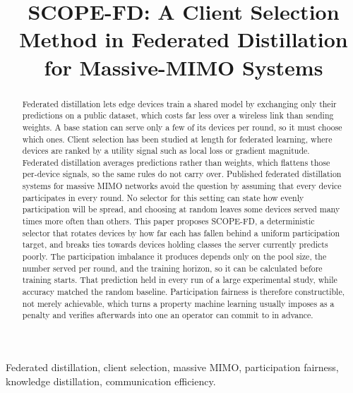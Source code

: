\documentclass[journal]{IEEEtran}
\newcommand{\rev}[1]{#1}
\begin{document}
\title{SCOPE-FD: A Client Selection Method in Federated Distillation for Massive-MIMO Systems}

\author{
}

\maketitle

\begin{abstract}
\rev{Federated distillation lets edge devices train a shared model by exchanging only their predictions on a public dataset, which costs far less over a wireless link than sending weights. A base station can serve only a few of its devices per round, so it must choose which ones. Client selection has been studied at length for federated learning, where devices are ranked by a utility signal such as local loss or gradient magnitude. Federated distillation averages predictions rather than weights, which flattens those per-device signals, so the same rules do not carry over. Published federated distillation systems for massive MIMO networks avoid the question by assuming that every device participates in every round. No selector for this setting can state how evenly participation will be spread, and choosing at random leaves some devices served many times more often than others. This paper proposes SCOPE-FD, a deterministic selector that rotates devices by how far each has fallen behind a uniform participation target, and breaks ties towards devices holding classes the server currently predicts poorly. The participation imbalance it produces depends only on the pool size, the number served per round, and the training horizon, so it can be calculated before training starts. That prediction held in every run of a large experimental study, while accuracy matched the random baseline. Participation fairness is therefore constructible, not merely achievable, which turns a property machine learning usually imposes as a penalty and verifies afterwards into one an operator can commit to in advance.}

\end{abstract}

\begin{IEEEkeywords}
Federated distillation, client selection, massive MIMO, participation fairness, knowledge distillation, communication efficiency.
\end{IEEEkeywords}
\end{document}
